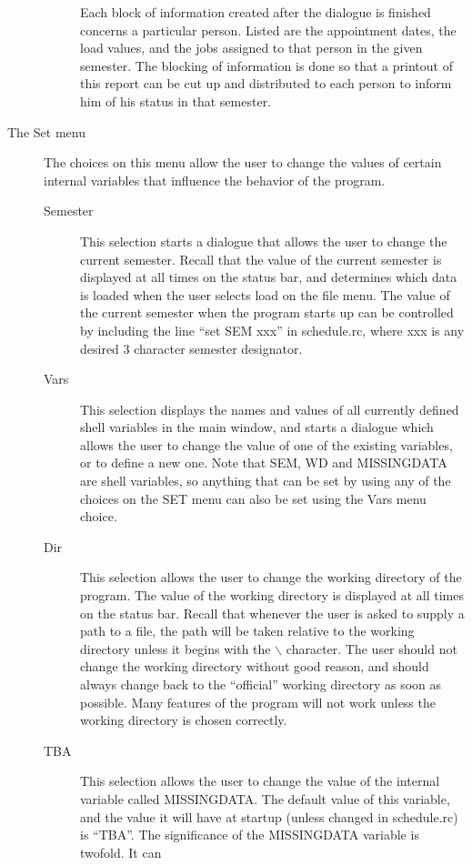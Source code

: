 \begin{description}
\begin{description}
Each block of information created after the dialogue is finished concerns 
a particular person. Listed are the appointment dates, the load values, and
the jobs assigned to that person in the given semester. The blocking of
information is done so that a printout of this report can be cut up and
distributed to each person to inform him of his status in that semester.
\end{description}
\item[The Set menu] The choices on  this menu allow the user to change
the values of certain internal variables that influence the behavior of the
program.
\begin{description}
\item[Semester] This selection starts a dialogue that allows the user to change
the current semester. Recall that the value of the current semester is
displayed at all times on the status bar, and determines which data is loaded
when the user selects load on the file menu. The value of the current
semester when the program starts up can be controlled by including the
line ``set SEM xxx'' in schedule.rc, where xxx is any desired 3 character
semester designator. 
\item[Vars] This selection displays the names and values of all currently
defined shell variables in the main window, and starts a dialogue which allows
the user to change the value of one of the existing variables, or to define
a new one. Note that SEM, WD and MISSINGDATA are shell variables, so anything
that can be set by using any of the choices on the SET menu can also be set
using the Vars menu choice. 
\item[Dir] This selection allows the user to change the working directory of
the program. The value of the working directory is displayed at all times
on the status bar. Recall that whenever the user is asked to supply a path
to a file, the path will be taken relative to the working directory unless
it begins with the $\backslash$ character. The user should not change the
working directory without good reason, and should always change back to
the ``official'' working directory as soon as possible. Many features of the
program will not work unless the working directory is chosen correctly.
\item[TBA] This selection allows the user to change the value of the
internal variable called MISSINGDATA. The default value of this variable,
and the value it will have at startup (unless changed in schedule.rc) is 
``TBA''. The significance of the MISSINGDATA variable is twofold. It can

\end{description}
\end{description}
